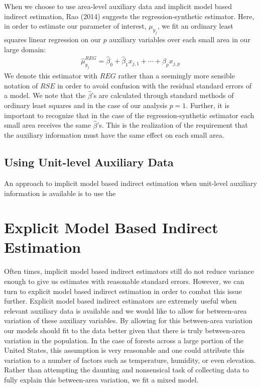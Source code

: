 \documentclass[12pt,twoside]{reedthesis}
\begin{document}
When we choose to use area-level auxiliary data and implicit model based indirect estimation, Rao (2014) suggests the regression-synthetic estimator. Here, in order to estimate our parameter of interest, \(\mu_{y_j}\), we fit an ordinary least squares linear regression on our \(p\) auxiliary variables over each small area in our large domain:
\begin{align}
\hat\mu_{y_j}^{REG} = \hat\beta_0 + \hat\beta_1 x_{j,1} + \cdots + \hat\beta_p x_{j,p}
\end{align}
We denote this estimator with \(REG\) rather than a seemingly more sensible notation of \(RSE\) in order to avoid confusion with the residual standard errors of a model. We note that the \(\hat \beta\)'s are calculated through standard methods of ordinary least squares and in the case of our analysis \(p=1\). Further, it is important to recognize that in the case of the regression-synthetic estimator each small area receives the same \(\hat\beta\)'s. This is the realization of the requirement that the auxiliary information must have the same effect on each small area.

\hypertarget{using-unit-level-auxiliary-data}{%
\subsection{Using Unit-level Auxiliary Data}\label{using-unit-level-auxiliary-data}}

An approach to implicit model based indirect estimation when unit-level auxiliary information is available is to use the

\hypertarget{explicit-model-based-indirect-estimation}{%
\section{Explicit Model Based Indirect Estimation}\label{explicit-model-based-indirect-estimation}}

Often times, implicit model based indirect estimators still do not reduce variance enough to give us estimates with reasonable standard errors. However, we can turn to explicit model based indirect estimation in order to combat this issue further. Explicit model based indirect estimators are extremely useful when relevant auxiliary data is available and we would like to allow for between-area variation of these auxiliary variables. By allowing for this between-area variation our models should fit to the data better given that there is truly between-area variation in the population. In the case of forests across a large portion of the United States, this assumption is very reasonable and one could attribute this variation to a number of factors such as temperature, humidity, or even elevation. Rather than attempting the daunting and nonsensical task of collecting data to fully explain this between-area variation, we fit a mixed model.
\end{document}
